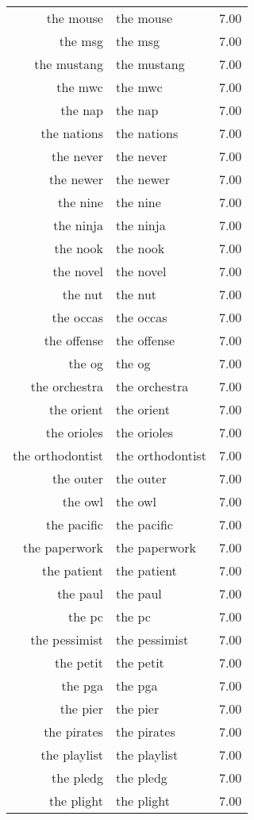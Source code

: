 \begin{table}[ht]
\begin{tabular}{rlr}
  the mouse & the mouse & 7.00 \\ 
  the msg & the msg & 7.00 \\ 
  the mustang & the mustang & 7.00 \\ 
  the mwc & the mwc & 7.00 \\ 
  the nap & the nap & 7.00 \\ 
  the nations & the nations & 7.00 \\ 
  the never & the never & 7.00 \\ 
  the newer & the newer & 7.00 \\ 
  the nine & the nine & 7.00 \\ 
  the ninja & the ninja & 7.00 \\ 
  the nook & the nook & 7.00 \\ 
  the novel & the novel & 7.00 \\ 
  the nut & the nut & 7.00 \\ 
  the occas & the occas & 7.00 \\ 
  the offense & the offense & 7.00 \\ 
  the og & the og & 7.00 \\ 
  the orchestra & the orchestra & 7.00 \\ 
  the orient & the orient & 7.00 \\ 
  the orioles & the orioles & 7.00 \\ 
  the orthodontist & the orthodontist & 7.00 \\ 
  the outer & the outer & 7.00 \\ 
  the owl & the owl & 7.00 \\ 
  the pacific & the pacific & 7.00 \\ 
  the paperwork & the paperwork & 7.00 \\ 
  the patient & the patient & 7.00 \\ 
  the paul & the paul & 7.00 \\ 
  the pc & the pc & 7.00 \\ 
  the pessimist & the pessimist & 7.00 \\ 
  the petit & the petit & 7.00 \\ 
  the pga & the pga & 7.00 \\ 
  the pier & the pier & 7.00 \\ 
  the pirates & the pirates & 7.00 \\ 
  the playlist & the playlist & 7.00 \\ 
  the pledg & the pledg & 7.00 \\ 
  the plight & the plight & 7.00 \\ 

\end{tabular}
\end{table}
